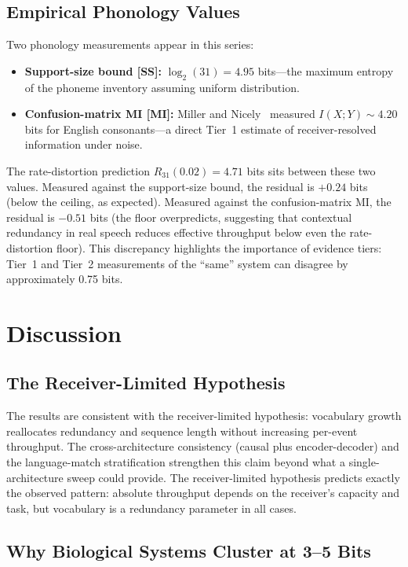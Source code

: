 \documentclass[11pt]{article}
\begin{document}
\subsection{Empirical Phonology Values}

Two phonology measurements appear in this series:
\begin{itemize}
    \item \textbf{Support-size bound [SS]:} $\log_2(31) = 4.95$ bits---the maximum entropy of the phoneme inventory assuming uniform distribution.
    \item \textbf{Confusion-matrix MI [MI]:} Miller and Nicely~\cite{millernicely1955} measured $I(X;Y) \sim 4.20$ bits for English consonants---a direct Tier~1 estimate of receiver-resolved information under noise.
\end{itemize}

The rate-distortion prediction $R_{31}(0.02) = 4.71$ bits sits between these two values. Measured against the support-size bound, the residual is $+0.24$ bits (below the ceiling, as expected). Measured against the confusion-matrix MI, the residual is $-0.51$ bits (the floor overpredicts, suggesting that contextual redundancy in real speech reduces effective throughput below even the rate-distortion floor). This discrepancy highlights the importance of evidence tiers: Tier~1 and Tier~2 measurements of the ``same'' system can disagree by approximately 0.75 bits.

\section{Discussion}

\subsection{The Receiver-Limited Hypothesis}

The results are consistent with the receiver-limited hypothesis: vocabulary growth reallocates redundancy and sequence length without increasing per-event throughput. The cross-architecture consistency (causal plus encoder-decoder) and the language-match stratification strengthen this claim beyond what a single-architecture sweep could provide. The receiver-limited hypothesis predicts exactly the observed pattern: absolute throughput depends on the receiver's capacity and task, but vocabulary is a redundancy parameter in all cases.

\subsection{Why Biological Systems Cluster at 3--5 Bits}
\end{document}
